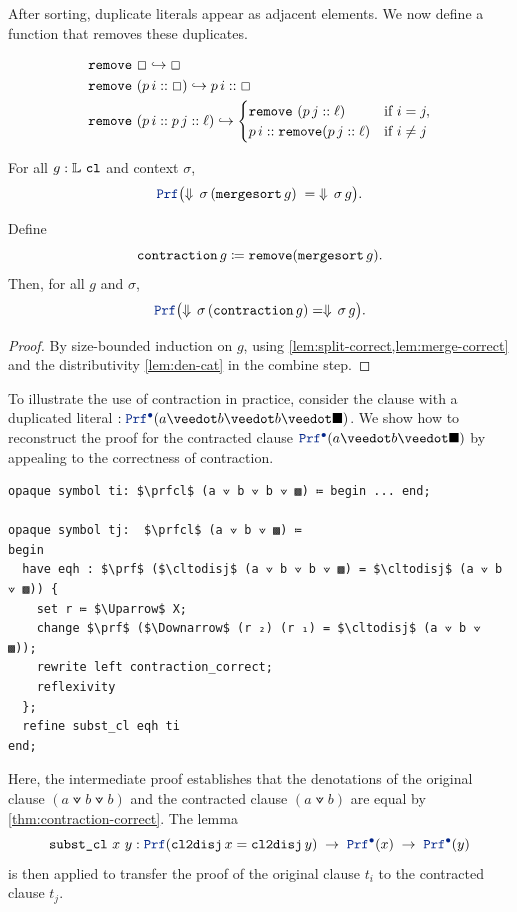 After sorting, duplicate literals appear as adjacent elements. We now define a function that removes these duplicates.


\begin{definition}
\begin{align*}
&\texttt{\upshape{remove}}~\Box \hookrightarrow \Box \\
&\texttt{\upshape{remove}}~(p\,i :: \Box) \hookrightarrow p\,i :: \Box \\
&\texttt{\upshape{remove}}~(p\,i :: p\,j :: \ell) \hookrightarrow
\begin{cases}
  \texttt{\upshape{remove}}~(p\,j :: \ell) & \text{if } i = j, \\
  p\,i :: \texttt{\upshape{remove}}(p\,j :: \ell) & \text{if } i \neq j
\end{cases}
\end{align*}
\end{definition}

\begin{theorem}\label{thm:mergesort-correct}
For all \(g: \mathbb{L}~\texttt{\upshape{cl}}\) and context \(\sigma\),
\[
  \prf\bigl(\Downarrow\,\sigma\,(\kw{mergesort}\,g) \;=\; \Downarrow\,\sigma\,g\bigr).
\]
\end{theorem}

\begin{theorem}\label{thm:contraction-correct}
Define
\[
  \texttt{\upshape{contraction}}\,g \coloneq \texttt{\upshape{remove}} (\texttt{\upshape{mergesort}}\,g).
\]
Then, for all \(g\) and \(\sigma\),
\[
\prf\bigl(\Downarrow\,\sigma\,(\kw{contraction}\,g) = \Downarrow\,\sigma\,g\bigr).
\]
\begin{proof}
By size-bounded induction on \(g\), using \cref{lem:split-correct,lem:merge-correct} and the distributivity \cref{lem:den-cat} in the combine step.
\end{proof}
\end{theorem}

\begin{example}[Contraction]
To illustrate the use of contraction in practice, consider the clause with a duplicated literal $: \prfcl (a \veedot b \veedot b \veedot \nil)$.
We show how to reconstruct the proof for the contracted clause $\prfcl (a \veedot b \veedot \nil)$ by appealing to the correctness of contraction.

\begin{lstlisting}[language=Lambdapi,mathescape=true,]
opaque symbol ti: $\prfcl$ (a ⟇ b ⟇ b ⟇ ▩) ≔ begin ... end;

opaque symbol tj:  $\prfcl$ (a ⟇ b ⟇ ▩) ≔
begin
  have eqh : $\prf$ ($\cltodisj$ (a ⟇ b ⟇ b ⟇ ▩) = $\cltodisj$ (a ⟇ b ⟇ ▩)) {
    set r ≔ $\Uparrow$ X;
    change $\prf$ ($\Downarrow$ (r ₂) (r ₁) = $\cltodisj$ (a ⟇ b ⟇ ▩));
    rewrite left contraction_correct;
    reflexivity
  };
  refine subst_cl eqh ti
end;
\end{lstlisting}
Here, the intermediate proof  establishes that the denotations of the original clause
$(a \veedot b \veedot b)$ and the contracted clause $(a \veedot b)$ are equal by \cref{thm:contraction-correct}.
The lemma
\[
  \kw{subst\_cl}~x~y: 
    \prf(\cltodisj\,x = \cltodisj\,y)
    \;\ra\; \prfcl(x) \;\ra\; \prfcl(y)
\]
is then applied to transfer the proof of the original clause $t_i$ to the contracted clause $t_j$.
\end{example}